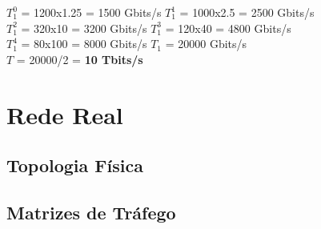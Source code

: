 \vspace{17pt}

$T_1^0$ = 1200x1.25 = 1500 Gbits/s \qquad
$T_1^1$ = 1000x2.5 = 2500 Gbits/s \\

$T_1^2$ = 320x10 = 3200 Gbits/s \qquad
$T_1^3$ = 120x40 = 4800 Gbits/s \\

$T_1^4$ = 80x100 = 8000 Gbits/s \qquad
$T_{1}$ = 20000 Gbits/s \\

$T$ = 20000/2 = \textbf{10 Tbits/s}

\section{Rede Real}
\label{realisticNetwork}


\subsection{Topologia Física}


\subsection{Matrizes de Tráfego}
\label{referenceTraffic}




\cleardoublepage